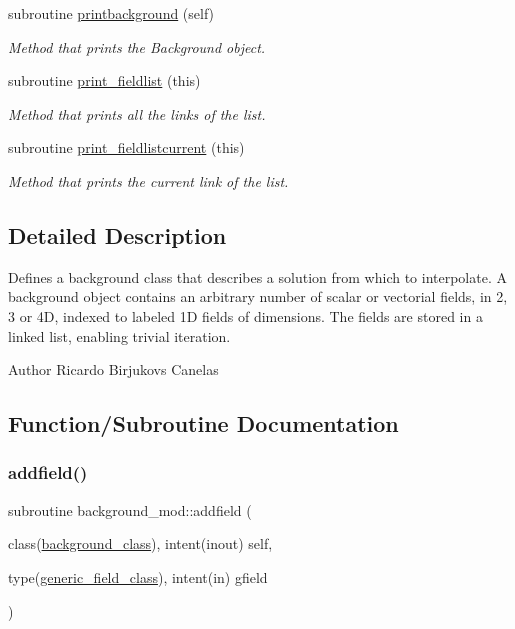 \begin{DoxyCompactItemize}
subroutine \mbox{\hyperlink{namespacebackground__mod_a8a8f225cffcddb742f22a402155b703f}{printbackground}} (self)
\begin{DoxyCompactList}\small\item\em Method that prints the Background object. \end{DoxyCompactList}\item 
subroutine \mbox{\hyperlink{namespacebackground__mod_acdcc52b4fb298bc145a121f9e8a4b929}{print\+\_\+fieldlist}} (this)
\begin{DoxyCompactList}\small\item\em Method that prints all the links of the list. \end{DoxyCompactList}\item 
subroutine \mbox{\hyperlink{namespacebackground__mod_a2bd18f3830c0667741efd086d36753db}{print\+\_\+fieldlistcurrent}} (this)
\begin{DoxyCompactList}\small\item\em Method that prints the current link of the list. \end{DoxyCompactList}\end{DoxyCompactItemize}


\subsection{Detailed Description}
Defines a background class that describes a solution from which to interpolate. A background object contains an arbitrary number of scalar or vectorial fields, in 2, 3 or 4D, indexed to labeled 1D fields of dimensions. The fields are stored in a linked list, enabling trivial iteration. 

\begin{DoxyAuthor}{Author}
Ricardo Birjukovs Canelas 
\end{DoxyAuthor}


\subsection{Function/\+Subroutine Documentation}
\mbox{\label{namespacebackground__mod_aa6ddc308698724f00ce1177ded5afc4c}} 
\subsubsection{\texorpdfstring{addfield()}{addfield()}}
{\footnotesize\ttfamily subroutine background\+\_\+mod\+::addfield (\begin{DoxyParamCaption}\item[{class(\mbox{\hyperlink{structbackground__mod_1_1background__class}{background\+\_\+class}}), intent(inout)}]{self,  }\item[{type(\mbox{\hyperlink{structfield__types__mod_1_1generic__field__class}{generic\+\_\+field\+\_\+class}}), intent(in)}]{gfield }\end{DoxyParamCaption})\hspace{0.3cm}{\ttfamily [private]}}



